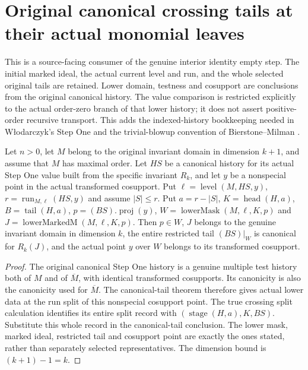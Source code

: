 \section{Original canonical crossing tails at their actual monomial leaves}

This is a source-facing consumer of the genuine interior identity empty
step.  The initial marked ideal, the actual current level and run, and the
whole selected original tails are retained.  Lower domain, testness and
cosupport are conclusions from the original canonical history.  The value
comparison is restricted explicitly to the actual order-zero branch of
that lower history; it does not assert positive-order recursive transport.
This adds the indexed-history bookkeeping needed in W\l odarczyk's Step
One and the trivial-blowup convention of Bierstone--Milman
\cite{wlodarczyk05-hironaka,bierstone-milman08-functoriality}.

\begin{theorem}
\label{hir:original-canonical-crossing-lower-data}
\leanok
{}
Let $n>0$, let $M$ belong to the original invariant domain in dimension
$k+1$, and assume that $M$ has maximal order.  Let $HS$ be a canonical
history for its actual Step One value built from the specific invariant
$R_k$, and let $y$ be a nonspecial point in the actual transformed
cosupport.  Put $\ell=\operatorname{level}(M,HS,y)$,
$r=\operatorname{run}_{M,\ell}(HS,y)$ and assume $|S|\leq r$.
Put $a=r-|S|$, $K=\operatorname{head}(H,a)$,
$B=\operatorname{tail}(H,a)$, $p=(BS).\operatorname{proj}(y)$,
$W=\operatorname{lowerMask}(M,\ell,K,p)$ and
$J=\operatorname{lowerMarkedM}(M,\ell,K,p)$.
Then $p\in W$, $J$ belongs to the genuine invariant domain in dimension
$k$, the entire restricted tail $(BS)|_W$ is canonical for $R_k(J)$,
and the actual point $y$ over $W$ belongs to its transformed cosupport.
\end{theorem}
\begin{proof}
The original canonical Step One history is a genuine multiple test
history both of $M$ and of $\overline M$, with identical transformed
cosupports.  Its canonicity is also the canonicity used for
$\overline M$.  The canonical-tail theorem therefore gives actual lower
data at the run split of this nonspecial cosupport point.  The true
crossing split calculation identifies its entire split record with
$(\operatorname{stage}(H,a),K,BS)$.  Substitute this whole record in
the canonical-tail conclusion.  The lower mask, marked ideal, restricted
tail and cosupport point are exactly the ones stated, rather than
separately selected representatives.  The dimension bound is
$(k+1)-1=k$.
\end{proof}


